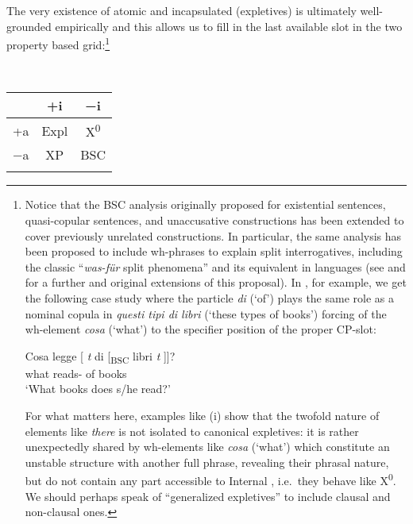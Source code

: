 \documentclass[output=paper]{langsci/langscibook}
\begin{document}
The very existence of atomic and incapsulated  (expletives)
is ultimately well-grounded empirically and this allows us to fill in the last
available slot in the two property based grid:\footnote{Notice that the
    \gls{BSC} analysis originally proposed for existential sentences,
    quasi-copular sentences, and unaccusative constructions has been extended
    to cover previously unrelated constructions. In particular, the same
    analysis has been proposed to include wh-phrases to explain split
    interrogatives, including the classic “\emph{was-für} split phenomena” and
    its equivalent in  languages (see \citealt{Moro2000} and
    \citealt{Ott2012} for a further and original extensions of this proposal).
    In , for example, we get the following case study where the
    particle \emph{di} (`of') plays the same role as a nominal copula
    in \emph{questi tipi di libri} (`these types of books') forcing  of
    the wh-element \emph{cosa} (`what') to the specifier position of the proper
    CP-slot:

\begin{exe}
	\gll Cosa legge [ \emph{t} di [\textsubscript{BSC}  libri  \emph{t} ]]?\\
		what reads-\Tsg{} {} {} of {} books {} {}\\
	\glt `What books does s/he read?'
\end{exe}

For what matters here, examples like (i) show that the twofold nature of
elements like \emph{there} is not isolated to canonical expletives: it is
rather unexpectedly shared by wh-elements like \emph{cosa} (`what') which
constitute an unstable structure with another full phrase, revealing their
phrasal nature, but do not contain any part accessible to Internal , i.e.\
they behave like X\textsuperscript{0}. We should perhaps speak of “generalized
expletives” to include clausal and non-clausal ones.}

\ea\label{ex:key:28.8}\leavevmode\\[-1\baselineskip] %
    \begin{tabular}{ccc}
    \lsptoprule
                & +i & −i\\
    \midrule
    +a & Expl        & X\textsuperscript{0}\\
    −a & XP          & BSC\\
    \lspbottomrule
    \end{tabular}
\z
\end{document}
